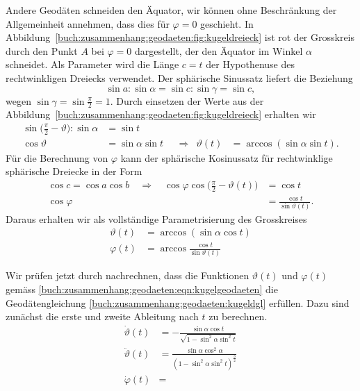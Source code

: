 Andere Geodäten schneiden den Äquator, wir können ohne Beschränkung der
Allgemeinheit annehmen, dass dies für $\varphi=0$ geschieht.
In Abbildung~\ref{buch:zusammenhang:geodaeten:fig:kugeldreieck}
ist rot der Grosskreis durch den Punkt $A$ bei $\varphi=0$ dargestellt,
der den Äquator im Winkel $\alpha$ schneidet.
Als Parameter wird die Länge $c=t$ der Hypothenuse des rechtwinkligen
Dreiecks verwendet.
Der sphärische Sinussatz liefert die Beziehung
\[
\sin a : \sin \alpha
=
\sin c : \sin\gamma
=
\sin c,
\]
wegen $\sin\gamma=\sin\frac{\pi}2=1$.
Durch einsetzen der Werte aus der
Abbildung~\ref{buch:zusammenhang:geodaeten:fig:kugeldreieck}
erhalten wir
\begin{align*}
\sin\biggl(\frac{\pi}2-\vartheta\biggr) : \sin\alpha
&=
\sin t
\\
\cos\vartheta
&=
\sin\alpha \sin t
&&\Rightarrow&
\vartheta(t) &= \arccos(\sin\alpha\sin t).
\end{align*}
Für die Berechnung von $\varphi$ kann der sphärische Kosinussatz
für rechtwinklige sphärische Dreiecke in der Form
\begin{align*}
\cos c = \cos a\cos b
\quad\Rightarrow\quad
\cos\varphi\cos\biggl(\frac{\pi}2-\vartheta(t)\biggr)
&=
\cos t
\\
\cos\varphi
&= 
\frac{
\cos t
}{
\sin\vartheta(t)
}.
\end{align*}
Daraus erhalten wir als vollständige Parametrisierung des Grosskreises
\begin{equation}
\begin{aligned}
\vartheta(t)
&=
\arccos(\sin\alpha\cos t)
\\
\varphi(t)
&=
\arccos\frac{\cos t}{\sin\vartheta(t)}
\end{aligned}
\label{buch:zusammenhang:geodaeten:eqn:kugelgeodaeten}
\end{equation}

Wir prüfen jetzt durch nachrechnen, dass die Funktionen
$\vartheta(t)$ und $\varphi(t)$ gemäss
\eqref{buch:zusammenhang:geodaeten:eqn:kugelgeodaeten}
die Geodätengleichung
\eqref{buch:zusammenhang:geodaeten:kugeldgl}
erfüllen.
Dazu sind zunächst die erste und zweite Ableitung nach $t$ zu berechnen.
\begin{align*}
\dot{\vartheta}(t)
&=
-\frac{\sin\alpha\cos t}{\sqrt{1-\sin^2\alpha\sin^2 t}}
\\
\ddot{\vartheta}(t)
&=
\frac{
\sin \alpha\cos^2\alpha
}{
(1-\sin^2\alpha\sin^2t)^{\frac32}
}
\\
\dot{\varphi}(t)
&=
\end{align*}

